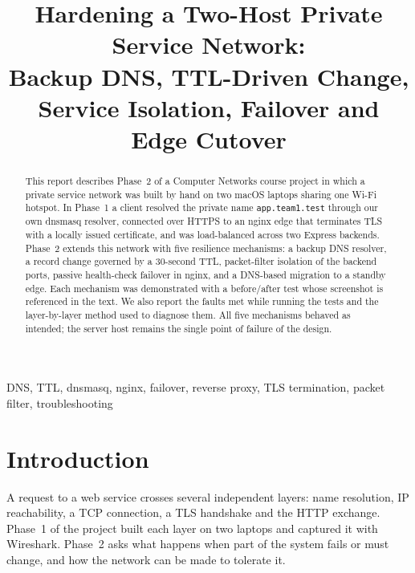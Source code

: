 \documentclass[conference]{IEEEtran}
\newcommand{\cmd}[1]{\texttt{#1}}
\begin{document}
\title{Hardening a Two-Host Private Service Network:\\ Backup DNS, TTL-Driven Change, Service Isolation, Failover and Edge Cutover}

\author{
\and
{}
}

\maketitle

\begin{abstract}
This report describes Phase~2 of a Computer Networks course project in which a private service network was built by hand on two macOS laptops sharing one Wi-Fi hotspot. In Phase~1 a client resolved the private name \cmd{app.team1.test} through our own dnsmasq resolver, connected over HTTPS to an nginx edge that terminates TLS with a locally issued certificate, and was load-balanced across two Express backends. Phase~2 extends this network with five resilience mechanisms: a backup DNS resolver, a record change governed by a 30-second TTL, packet-filter isolation of the backend ports, passive health-check failover in nginx, and a DNS-based migration to a standby edge. Each mechanism was demonstrated with a before/after test whose screenshot is referenced in the text. We also report the faults met while running the tests and the layer-by-layer method used to diagnose them. All five mechanisms behaved as intended; the server host remains the single point of failure of the design.
\end{abstract}

\begin{IEEEkeywords}
DNS, TTL, dnsmasq, nginx, failover, reverse proxy, TLS termination, packet filter, troubleshooting
\end{IEEEkeywords}

\section{Introduction}
A request to a web service crosses several independent layers: name resolution, IP reachability, a TCP connection, a TLS handshake and the HTTP exchange. Phase~1 of the project built each layer on two laptops and captured it with Wireshark. Phase~2 asks what happens when part of the system fails or must change, and how the network can be made to tolerate it.
\end{document}
